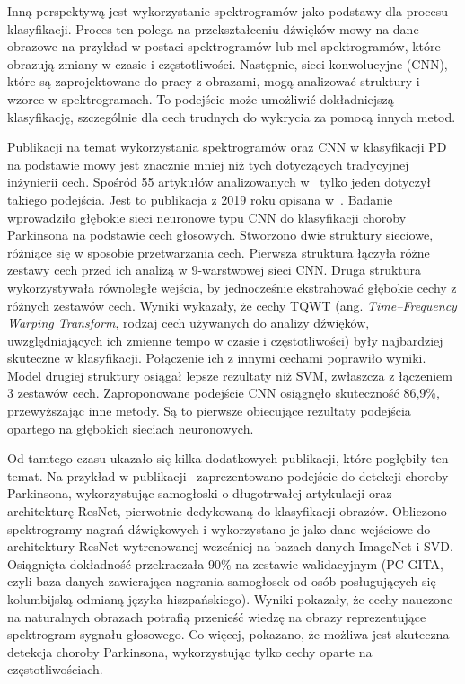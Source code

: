 Inną perspektywą jest wykorzystanie spektrogramów jako podstawy dla procesu klasyfikacji.
Proces ten polega na przekształceniu dźwięków mowy na dane obrazowe na przykład w postaci spektrogramów lub mel-spektrogramów, które obrazują zmiany w czasie i częstotliwości.
Następnie, sieci konwolucyjne (CNN), które są zaprojektowane do pracy z obrazami, mogą analizować struktury i wzorce w spektrogramach.
To podejście może umożliwić dokładniejszą klasyfikację, szczególnie dla cech trudnych do wykrycia za pomocą innych metod.

Publikacji na temat wykorzystania spektrogramów oraz CNN w klasyfikacji PD na podstawie mowy jest znacznie mniej niż tych dotyczących tradycyjnej inżynierii cech.
Spośród 55 artykułów analizowanych w~\cite{ML_for_PD_review} tylko jeden dotyczył takiego podejścia.
Jest to publikacja z 2019 roku opisana w~\cite{Gunduz}.
Badanie wprowadziło głębokie sieci neuronowe typu CNN do klasyfikacji choroby Parkinsona na podstawie cech głosowych.
Stworzono dwie struktury sieciowe, różniące się w sposobie przetwarzania cech.
Pierwsza struktura łączyła różne zestawy cech przed ich analizą w 9-warstwowej sieci CNN. Druga struktura wykorzystywała
równoległe wejścia, by jednocześnie ekstrahować głębokie cechy z różnych zestawów cech.
Wyniki wykazały, że cechy TQWT (ang. \emph{Time–Frequency Warping Transform}, rodzaj cech używanych do analizy dźwięków,
uwzględniających ich zmienne tempo w czasie i częstotliwości) były najbardziej skuteczne w klasyfikacji.
Połączenie ich z innymi cechami poprawiło wyniki.
Model drugiej struktury osiągał lepsze rezultaty niż SVM, zwłaszcza z łączeniem 3 zestawów cech.
Zaproponowane podejście CNN osiągnęło skuteczność 86,9\%, przewyższając inne metody.
Są to pierwsze obiecujące rezultaty podejścia opartego na głębokich sieciach neuronowych.

Od tamtego czasu ukazało się kilka dodatkowych publikacji, które pogłębiły ten temat.
Na przykład w publikacji~\cite{Wodzinski} zaprezentowano podejście do detekcji choroby Parkinsona, wykorzystując samogłoski o długotrwałej artykulacji oraz architekturę ResNet,
pierwotnie dedykowaną do klasyfikacji obrazów.
Obliczono spektrogramy nagrań dźwiękowych i wykorzystano je jako dane wejściowe do architektury ResNet wytrenowanej wcześniej na bazach danych ImageNet i SVD\@.
Osiągnięta dokładność przekraczała 90\% na zestawie walidacyjnym (PC-GITA, czyli baza danych zawierająca nagrania samogłosek od
osób posługujących się kolumbijską odmianą języka hiszpańskiego).
Wyniki pokazały, że cechy  nauczone na naturalnych obrazach potrafią przenieść wiedzę na obrazy reprezentujące spektrogram sygnału głosowego.
Co więcej, pokazano, że możliwa jest skuteczna detekcja choroby Parkinsona, wykorzystując tylko cechy oparte na częstotliwościach.



